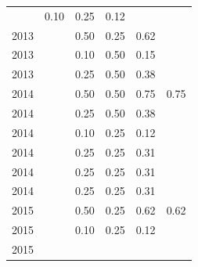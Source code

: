 \begin{table}[H]
\begin{tabular}{| l | c | c | c | c | c |}
          &
          0.10
          &
          0.25
          &
          0.12
          &
          \\
            2013
          &
          
          &
          0.50
          &
          0.25
          &
          0.62
          &
          \\
            2013
          &
          
          &
          0.10
          &
          0.50
          &
          0.15
          &
          \\
            2013
          &
          
          &
          0.25
          &
          0.50
          &
          0.38
          &
          \\
\hline
            2014
          &
          
          &
          0.50
          &
          0.50
          &
          0.75
          &
            {\color{blue} 0.75}
          \\
            2014
          &
          
          &
          0.25
          &
          0.50
          &
          0.38
          &
          \\
            2014
          &
          
          &
          0.10
          &
          0.25
          &
          0.12
          &
          \\
            2014
          &
          
          &
          0.25
          &
          0.25
          &
          0.31
          &
          \\
            2014
          &
          
          &
          0.25
          &
          0.25
          &
          0.31
          &
          \\
            2014
          &
          
          &
          0.25
          &
          0.25
          &
          0.31
          &
          \\
\hline
            2015
          &
          
          &
          0.50
          &
          0.25
          &
          0.62
          &
            {\color{blue} 0.62}
          \\
            2015
          &
          
          &
          0.10
          &
          0.25
          &
          0.12
          &
          \\
            2015
          &
          

\end{tabular}
\end{table}
